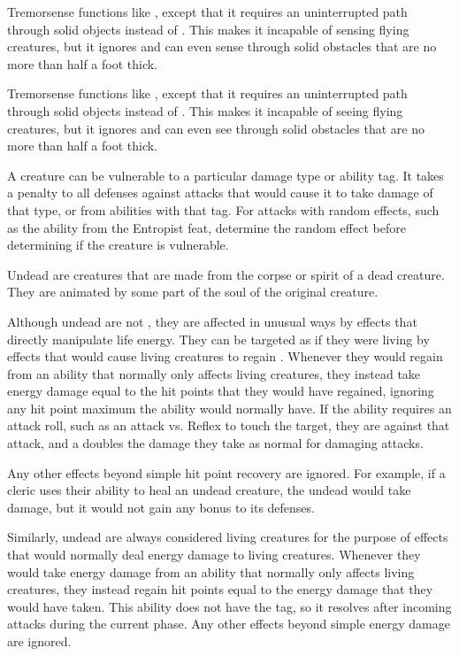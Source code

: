         Tremorsense functions like , except that it requires an uninterrupted path through solid objects instead of .
        This makes it incapable of sensing flying creatures, but it ignores  and can even sense through solid obstacles that are no more than half a foot thick.

        Tremorsense functions like , except that it requires an uninterrupted path through solid objects instead of .
        This makes it incapable of seeing flying creatures, but it ignores  and can even see through solid obstacles that are no more than half a foot thick.

        A creature can be vulnerable to a particular damage type or ability tag.
        It takes a  penalty to all defenses against attacks that would cause it to take damage of that type, or from abilities with that tag.
        For attacks with random effects, such as the  ability from the Entropist feat, determine the random effect before determining if the creature is vulnerable.

        Undead are creatures that are made from the corpse or spirit of a dead creature.
        They are animated by some part of the soul of the original creature.

        Although undead are not , they are affected in unusual ways by effects that directly manipulate life energy.
        They can be targeted as if they were living  by effects that would cause living creatures to regain .
        Whenever they would regain  from an ability that normally only affects living creatures, they instead take energy damage equal to the hit points that they would have regained, ignoring any hit point maximum the ability would normally have.
        If the ability requires an attack roll, such as an attack vs. Reflex to touch the target, they are \vulnerable against that attack, and a  doubles the damage they take as normal for damaging attacks.

        Any other effects beyond simple hit point recovery are ignored.
        For example, if a cleric uses their  ability to heal an undead creature, the undead would take damage, but it would not gain any bonus to its defenses.

        Similarly, undead are always considered living creatures for the purpose of effects that would normally deal energy damage to living creatures.
        Whenever they would take energy damage from an ability that normally only affects living creatures, they instead regain hit points equal to the energy damage that they would have taken. 
        This ability does not have the  tag, so it resolves after incoming attacks during the current phase.
        Any other effects beyond simple energy damage are ignored.
